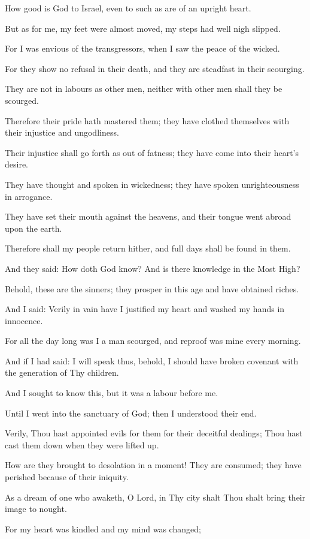 How good is God to Israel, even to such as are of an upright heart.

But as for me, my feet were almost moved, my steps had well nigh slipped.

For I was envious of the transgressors, when I saw the peace of the wicked.

For they show no refusal in their death, and they are steadfast in their scourging.

They are not in labours as other men, neither with other men shall they be scourged.

Therefore their pride hath mastered them; they have clothed themselves with their injustice and ungodliness.

Their injustice shall go forth as out of fatness; they have come into their heart’s desire.

They have thought and spoken in wickedness; they have spoken unrighteousness in arrogance.

They have set their mouth against the heavens, and their tongue went abroad upon the earth.

Therefore shall my people return hither, and full days shall be found in them.

And they said: How doth God know? And is there knowledge in the Most High?

Behold, these are the sinners; they prosper in this age and have obtained riches.

And I said: Verily in vain have I justified my heart and washed my hands in innocence.

For all the day long was I a man scourged, and reproof was mine every morning.

And if I had said: I will speak thus, behold, I should have broken covenant with the generation of Thy children.

And I sought to know this, but it was a labour before me.

Until I went into the sanctuary of God; then I understood their end.

Verily, Thou hast appointed evils for them for their deceitful dealings; Thou hast cast them down when they were lifted up.

How are they brought to desolation in a moment! They are consumed; they have perished because of their iniquity.

As a dream of one who awaketh, O Lord, in Thy city shalt Thou shalt bring their image to nought.

For my heart was kindled and my mind was changed;

